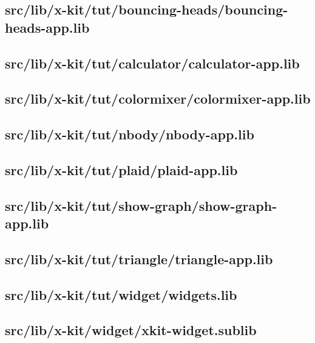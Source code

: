 \subsection{src/lib/x-kit/tut/bouncing-heads/bouncing-heads-app.lib}


\subsection{src/lib/x-kit/tut/calculator/calculator-app.lib}


\subsection{src/lib/x-kit/tut/colormixer/colormixer-app.lib}


\subsection{src/lib/x-kit/tut/nbody/nbody-app.lib}


\subsection{src/lib/x-kit/tut/plaid/plaid-app.lib}


\subsection{src/lib/x-kit/tut/show-graph/show-graph-app.lib}


\subsection{src/lib/x-kit/tut/triangle/triangle-app.lib}


\subsection{src/lib/x-kit/tut/widget/widgets.lib}


\subsection{src/lib/x-kit/widget/xkit-widget.sublib}


